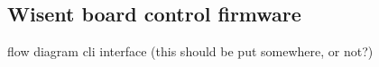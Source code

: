 \subsection{ Wisent board control firmware}
    flow diagram
    cli interface (this should be put somewhere, or not?)





%
%
%
%
%
%
%
%
%
%
%
%
%
